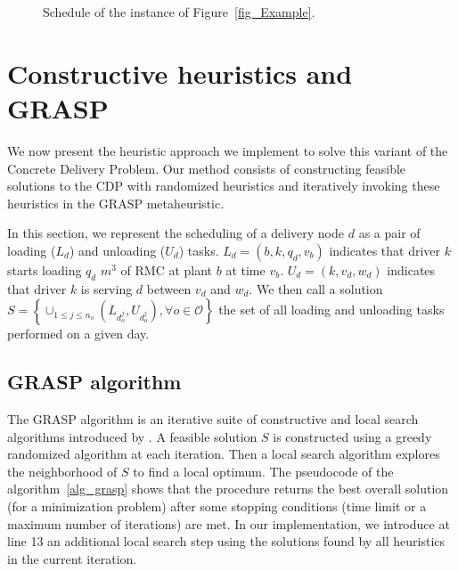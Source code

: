 \documentclass{article}
\begin{document}
\begin{figure}[!htb]
\begin{adjustbox}{max width=0.85\textwidth}
    \end{adjustbox}
    \caption{Schedule of the instance of Figure~\ref{fig_Example}.}
    \label{fig:ganttExample}
\end{figure}


\section{Constructive heuristics and GRASP}
\label{grasp_method}

We now present the heuristic approach we implement to solve this variant of the Concrete Delivery Problem. Our method consists of constructing feasible solutions to the CDP with randomized heuristics and iteratively invoking these heuristics in the GRASP metaheuristic.

In this section, we represent the scheduling of a delivery node $d$ as a pair of loading ($L_{d}$) and unloading ($U_{d}$) tasks. $L_{d} = \left(b,k,q_d,v_b\right) $ indicates that driver $k$ starts loading $q_d$ $m^3$ of RMC at plant $b$ at time $v_b$. $U_{d} = \left(k,v_d, w_d\right)$ indicates that driver $k$ is serving $d$ between $v_d$ and $w_d$. We then call a solution $ S =\left\lbrace \cup _{1 \leq j \leq n_o} (L_{d^j_{o}}, U_{d^j_{o}}), \forall o \in \mathcal{O} \right\rbrace$ the set of all loading and unloading tasks performed on a given day.

\subsection{GRASP algorithm }

The GRASP algorithm is an iterative suite of constructive and local search algorithms introduced by \cite{feo1995greedy}. A feasible solution $S$ is constructed using a greedy randomized algorithm at each iteration. Then a local search algorithm explores the neighborhood of $S$ to find a local optimum. The pseudocode of the algorithm~\ref{alg_grasp} shows that the procedure returns the best overall solution (for a minimization problem) after some stopping conditions (time limit or a maximum number of iterations) are met. In our implementation, we introduce at line 13 an additional local search step using the solutions found by all heuristics in the current iteration.
\end{document}
